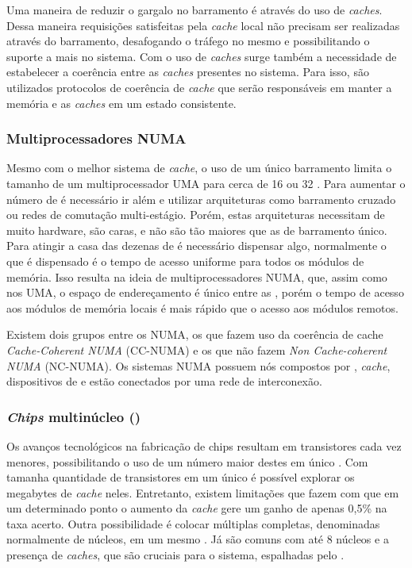 Uma maneira de reduzir o gargalo no barramento é através do uso de \textit{caches}. Dessa maneira requisições satisfeitas pela \textit{cache} local não precisam ser realizadas através do barramento, desafogando o tráfego no mesmo e possibilitando o suporte a mais \cpus no sistema. Com o uso de \textit{caches} surge também a necessidade de estabelecer a coerência entre as \textit{caches} presentes no sistema. Para isso, são utilizados protocolos de coerência de \textit{cache} que serão responsáveis em manter a memória e as \textit{caches} em um estado consistente.

\subsubsection{Multiprocessadores NUMA}
\label{subsubsec:hw-multiprocessadores-numa}

Mesmo com o melhor sistema de \textit{cache}, o uso de um único barramento limita o tamanho de um multiprocessador UMA para cerca de 16 ou 32 \cpus \cite{Tanenbaum:2014:MOS:2655363}. Para aumentar o número de \cpus é necessário ir além e utilizar arquiteturas como barramento cruzado ou redes de comutação multi-estágio. Porém, estas arquiteturas necessitam de muito hardware, são caras, e não são tão maiores que as de barramento único. Para atingir a casa das dezenas de \cpus é necessário dispensar algo, normalmente o que é dispensado é o tempo de acesso uniforme para todos os módulos de memória. Isso resulta na ideia de multiprocessadores NUMA, que, assim como nos UMA, o espaço de endereçamento é único entre as \cpus, porém o tempo de acesso aos módulos de memória locais é mais rápido que o acesso aos módulos remotos.

Existem dois grupos entre os NUMA, os que fazem uso da coerência de cache \textit{Cache-Coherent NUMA} (CC-NUMA) e os que não fazem \textit{Non Cache-coherent NUMA} (NC-NUMA). Os sistemas NUMA possuem nós compostos por \cpu, \textit{cache}, dispositivos de \io e estão conectados por uma rede de interconexão.

\subsubsection{\textit{Chips} multinúcleo (\multicore)}
\label{subsubsec:chips-multinucleo}

Os avanços tecnológicos na fabricação de chips resultam em transistores cada vez menores, possibilitando o uso de um número maior destes em único \chip. Com tamanha quantidade de transistores em um único \chip é possível explorar os megabytes de \textit{cache} neles. Entretanto, existem limitações que fazem com que em um determinado ponto o aumento da \textit{cache} gere um ganho de apenas 0,5\% na taxa acerto. Outra possibilidade é colocar múltiplas \cpus completas, denominadas normalmente de núcleos, em um mesmo \chip. Já são comuns \chips com até 8 núcleos e a presença de \textit{caches}, que são cruciais para o sistema, espalhadas pelo \chip.

